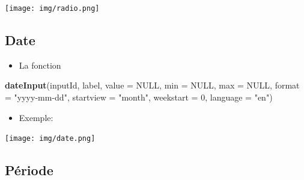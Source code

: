 \documentclass[
]{article}
\newenvironment{Shaded}{\begin{snugshade}}{\end{snugshade}}
\newcommand{\AttributeTok}[1]{\textcolor[rgb]{0.13,0.29,0.53}{#1}}
\newcommand{\CommentTok}[1]{\textcolor[rgb]{0.56,0.35,0.01}{\textit{#1}}}
\newcommand{\ConstantTok}[1]{\textcolor[rgb]{0.56,0.35,0.01}{#1}}
\newcommand{\DecValTok}[1]{\textcolor[rgb]{0.00,0.00,0.81}{#1}}
\newcommand{\FunctionTok}[1]{\textcolor[rgb]{0.13,0.29,0.53}{\textbf{#1}}}
\newcommand{\NormalTok}[1]{#1}
\newcommand{\StringTok}[1]{\textcolor[rgb]{0.31,0.60,0.02}{#1}}
\providecommand{\tightlist}{%
  \setlength{\itemsep}{0pt}\setlength{\parskip}{0pt}}
\begin{document}
\texttt{[image: img/radio.png]}

\hypertarget{date}{%
\subsection{Date}\label{date}}

\begin{itemize}
\tightlist
\item
  La fonction
\end{itemize}

\begin{Shaded}
\begin{Highlighting}[]
\FunctionTok{dateInput}\NormalTok{(inputId, label, }\AttributeTok{value =} \ConstantTok{NULL}\NormalTok{, }\AttributeTok{min =} \ConstantTok{NULL}\NormalTok{, }\AttributeTok{max =} \ConstantTok{NULL}\NormalTok{, }\AttributeTok{format =} \StringTok{"yyyy{-}mm{-}dd"}\NormalTok{, }
          \AttributeTok{startview =} \StringTok{"month"}\NormalTok{, }\AttributeTok{weekstart =} \DecValTok{0}\NormalTok{, }\AttributeTok{language =} \StringTok{"en"}\NormalTok{)}
\end{Highlighting}
\end{Shaded}

\begin{itemize}
\tightlist
\item
  Exemple:
\end{itemize}

\begin{Shaded}
\end{Shaded}

\texttt{[image: img/date.png]}

\hypertarget{puxe9riode}{%
\subsection{Période}\label{puxe9riode}}
\end{document}

